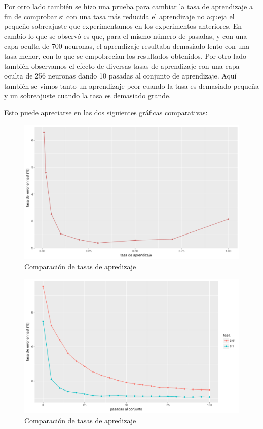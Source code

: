 \documentclass[10pt,a4paper]{article}
\begin{document}
Por otro lado también se hizo una prueba para cambiar la tasa de aprendizaje a fin de comprobar si con una tasa más reducida el aprendizaje no aqueja el pequeño sobreajuste que experimentamos en los experimentos anteriores. En cambio lo que se observó es que, para el mismo número de pasadas, y con una capa oculta de 700 neuronas, el aprendizaje resultaba demasiado lento con una tasa menor, con lo que se empobrecían los resultados obtenidos. Por otro lado también observamos el efecto de diversas tasas de aprendizaje con una capa oculta de 256 neuronas dando 10 pasadas al conjunto de aprendizaje. Aquí también se vimos tanto un aprendizaje peor cuando la tasa es demasiado pequeña y un sobreajuste cuando la tasa es demasiado grande.

Esto puede apreciarse en las dos siguientes gráficas comparativas:

\begin{figure}[H]
\includegraphics[scale=0.5]{img/tasas.pdf}
\caption{Comparación de tasas de apredizaje}
\end{figure}

\begin{figure}[H]
\includegraphics[scale=0.5]{img/tasa.pdf}
\caption{Comparación de tasas de apredizaje}
\end{figure}
\end{document}

